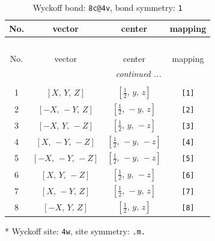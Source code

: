 \documentclass[fleqn,8pt]{jsarticle}
\begin{document}
\renewcommand{\arraystretch}{1.2}
\begin{longtable}{cccc}
\caption{Wyckoff bond: {\tt 8c@4v}, bond symmetry: {\tt 1}}
 \\
 \hline \hline
No. & vector & center & mapping \\ \hline \endfirsthead

\multicolumn{3}{l}{\tablename\ \thetable{}} \\
 \hline \hline
No. & vector & center & mapping \\ \hline \endhead

 \hline \hline
\multicolumn{3}{r}{\footnotesize\it continued ...} \\ \endfoot

 \hline \hline
\multicolumn{3}{r}{} \\ \endlastfoot

1 & $\left[ X,\, Y,\, Z \right]$ & $\left[ \frac{1}{2},\, y,\, z \right]$ & {\tt [1]} \\ \hline
2 & $\left[ - X,\, - Y,\, Z \right]$ & $\left[ \frac{1}{2},\, - y,\, z \right]$ & {\tt [2]} \\ \hline
3 & $\left[ - X,\, Y,\, - Z \right]$ & $\left[ \frac{1}{2},\, y,\, - z \right]$ & {\tt [3]} \\ \hline
4 & $\left[ X,\, - Y,\, - Z \right]$ & $\left[ \frac{1}{2},\, - y,\, - z \right]$ & {\tt [4]} \\ \hline
5 & $\left[ - X,\, - Y,\, - Z \right]$ & $\left[ \frac{1}{2},\, - y,\, - z \right]$ & {\tt [5]} \\ \hline
6 & $\left[ X,\, Y,\, - Z \right]$ & $\left[ \frac{1}{2},\, y,\, - z \right]$ & {\tt [6]} \\ \hline
7 & $\left[ X,\, - Y,\, Z \right]$ & $\left[ \frac{1}{2},\, - y,\, z \right]$ & {\tt [7]} \\ \hline
8 & $\left[ - X,\, Y,\, Z \right]$ & $\left[ \frac{1}{2},\, y,\, z \right]$ & {\tt [8]} \\
\end{longtable}
* Wyckoff site: {\tt 4w}, site symmetry: {\tt .m.}
\renewcommand{\arraystretch}{1.2}
\end{document}
